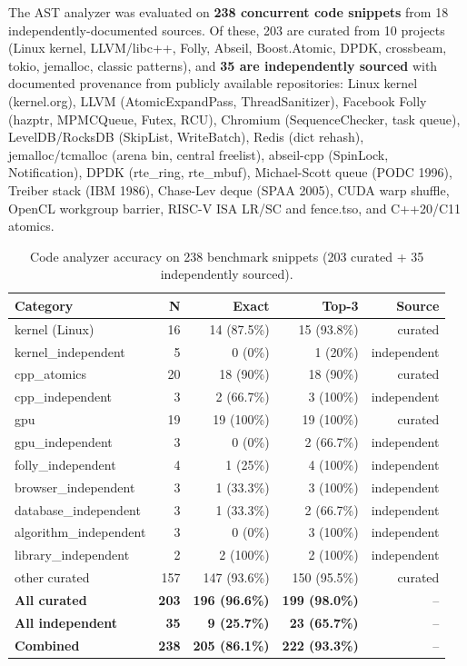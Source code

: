 \documentclass[11pt]{article}
\begin{document}
The AST analyzer was evaluated on \textbf{238 concurrent code
snippets} from 18 independently-documented sources.
Of these, 203 are curated from 10 projects
(Linux kernel, LLVM\slash libc++, Folly, Abseil,
Boost.Atomic, DPDK, crossbeam, tokio, jemalloc, classic patterns),
and \textbf{35 are independently sourced} with documented provenance from
publicly available repositories: Linux kernel (kernel.org),
LLVM (AtomicExpandPass, ThreadSanitizer), Facebook Folly
(hazptr, MPMCQueue, Futex, RCU), Chromium (SequenceChecker, task queue),
LevelDB/RocksDB (SkipList, WriteBatch), Redis (dict rehash),
jemalloc/tcmalloc (arena bin, central freelist),
abseil-cpp (SpinLock, Notification), DPDK (rte\_ring, rte\_mbuf),
Michael-Scott queue (PODC 1996), Treiber stack (IBM 1986),
Chase-Lev deque (SPAA 2005), CUDA warp shuffle, OpenCL workgroup barrier,
RISC-V ISA LR/SC and fence.tso, and C++20/C11 atomics.

\begin{table}[ht]
\centering
\caption{Code analyzer accuracy on 238 benchmark snippets (203 curated + 35 independently sourced).}
\label{tab:ast-accuracy}
\small
\begin{tabular}{lrrrr}
\toprule
\textbf{Category} & \textbf{N} & \textbf{Exact} & \textbf{Top-3} & \textbf{Source} \\
\midrule
kernel (Linux)          & 16  & 14 (87.5\%) & 15 (93.8\%) & curated \\
kernel\_independent     & 5   & 0 (0\%)     & 1 (20\%)    & independent \\
cpp\_atomics            & 20  & 18 (90\%)   & 18 (90\%)   & curated \\
cpp\_independent        & 3   & 2 (66.7\%)  & 3 (100\%)   & independent \\
gpu                     & 19  & 19 (100\%)  & 19 (100\%)  & curated \\
gpu\_independent        & 3   & 0 (0\%)     & 2 (66.7\%)  & independent \\
folly\_independent      & 4   & 1 (25\%)    & 4 (100\%)   & independent \\
browser\_independent    & 3   & 1 (33.3\%)  & 3 (100\%)   & independent \\
database\_independent   & 3   & 1 (33.3\%)  & 2 (66.7\%)  & independent \\
algorithm\_independent  & 3   & 0 (0\%)     & 3 (100\%)   & independent \\
library\_independent    & 2   & 2 (100\%)   & 2 (100\%)   & independent \\
other curated           & 157 & 147 (93.6\%) & 150 (95.5\%) & curated \\
\midrule
\textbf{All curated}    & \textbf{203} & \textbf{196 (96.6\%)} & \textbf{199 (98.0\%)} & -- \\
\textbf{All independent} & \textbf{35} & \textbf{9 (25.7\%)} & \textbf{23 (65.7\%)} & -- \\
\textbf{Combined}       & \textbf{238} & \textbf{205 (86.1\%)} & \textbf{222 (93.3\%)} & -- \\
\bottomrule
\end{tabular}
\end{table}
\end{document}

